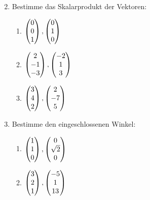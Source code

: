 \begin{enumerate}
\begin{multicols}{3}
\begin{enumerate}
				\end{enumerate}
			\end{multicols}
			\item Bestimme das Skalarprodukt der Vektoren:
			\begin{multicols}{3}
				\begin{enumerate}
				    \item $\mvect{0\\0\\1},\mvect{0\\1\\0}$
				    \item $\mvect{2\\-1\\-3}, \mvect{-2\\1\\3}$
				    \item $\mvect{3\\4\\2},\mvect{2\\-7\\5}$
			    \end{enumerate}
			\end{multicols}
			\item Bestimme den eingeschlossenen Winkel:
			\begin{multicols}{2}
				\begin{enumerate}
			    	\item $\mvect{1\\1\\0},\mvect{0\\\sqrt{2}\\0}$
			    	\item $\mvect{3\\2\\1},\mvect{-5\\1\\13}$
			    \end{enumerate}
			\end{multicols}
       

\end{enumerate}

